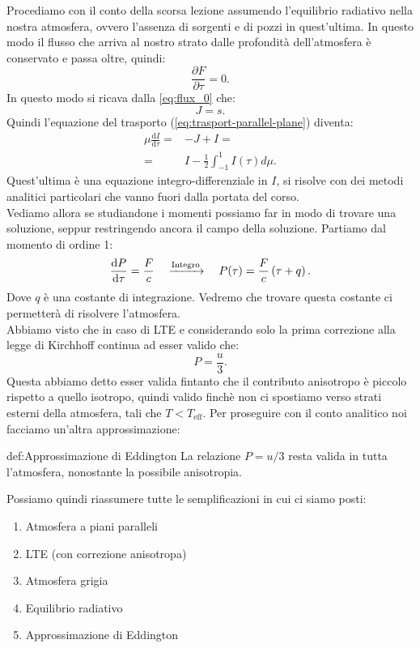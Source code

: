 Procediamo con il conto della scorsa lezione assumendo l'equilibrio radiativo nella nostra atmosfera, ovvero l'assenza di sorgenti e di pozzi in quest'ultima. In questo modo il flusso che arriva al nostro strato dalle profondità dell'atmosfera è conservato e passa oltre, quindi:
\[
	\frac{\partial F}{\partial \tau } = 0 
.\] 
In questo modo si ricava dalla \ref{eq:flux_0} che:
 \[
	J = s
.\] 
Quindi l'equazione del trasporto (\ref{eq:trasport-parallel-plane}) diventa:
\begin{align}
	\mu \frac{\mbox{d} I}{\mbox{d} \tau } =& - J + I =\\
	= & I - \frac{1}{2}\int_{-1}^{1} I( \tau )  d\mu  
.\end{align}
Quest'ultima è una equazione integro-differenziale in $I$, si risolve con dei metodi analitici particolari che vanno fuori dalla portata del corso.\\
Vediamo allora se studiandone i momenti possiamo far in modo di trovare una soluzione, seppur restringendo ancora il campo della soluzione. Partiamo dal momento di ordine 1:
\begin{align}
	&\frac{\mbox{d} P}{\mbox{d} \tau } = \frac{F}{c} &
	&\ce{ ->[Integro]}
	& P( \tau ) = \frac{F}{c}\left( \tau + q \right) 
.\end{align}
Dove $q$ è una costante di integrazione. Vedremo che trovare questa costante ci permetterà di risolvere l'atmosfera.\\ 
Abbiamo visto che in caso di LTE e considerando solo la prima correzione alla legge di Kirchhoff continua ad esser valido che:
\[
	P = \frac{u}{3}
.\] 
Questa abbiamo detto esser valida fintanto che il contributo anisotropo è piccolo rispetto a quello isotropo, quindi valido finchè non ci spostiamo verso strati esterni della atmosfera, tali che $T < T_{\text{eff}}$. Per proseguire con il conto analitico noi facciamo un'altra approssimazione:
\begin{defn}{def:Approssimazione di Eddington}
	La relazione $P = u /3$ resta valida in tutta l'atmosfera, nonostante la possibile anisotropia.
\end{defn}
Possiamo quindi riassumere tutte le semplificazioni in cui ci siamo posti:
\begin{enumerate}
	\item Atmosfera a piani paralleli
	\item LTE (con correzione anisotropa)
	\item Atmosfera grigia
	\item Equilibrio radiativo
	\item Approssimazione di Eddington
\end{enumerate}
